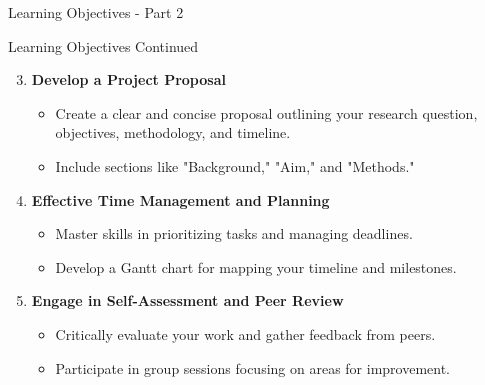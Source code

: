 \documentclass[aspectratio=169]{beamer}
\begin{document}
\begin{frame}[fragile]{Learning Objectives - Part 2}
    \begin{block}{Learning Objectives Continued}
        \begin{enumerate}
            \setcounter{enumi}{2} %
            
            \item \textbf{Develop a Project Proposal}
            \begin{itemize}
                \item Create a clear and concise proposal outlining your research question, objectives, methodology, and timeline.
                \item Include sections like "Background," "Aim," and "Methods."
            \end{itemize}
            
            \item \textbf{Effective Time Management and Planning}
            \begin{itemize}
                \item Master skills in prioritizing tasks and managing deadlines.
                \item Develop a Gantt chart for mapping your timeline and milestones.
            \end{itemize}
            
            \item \textbf{Engage in Self-Assessment and Peer Review}
            \begin{itemize}
                \item Critically evaluate your work and gather feedback from peers.
                \item Participate in group sessions focusing on areas for improvement.
            \end{itemize}
        \end{enumerate}
    \end{block}
\end{frame}
\end{document}
